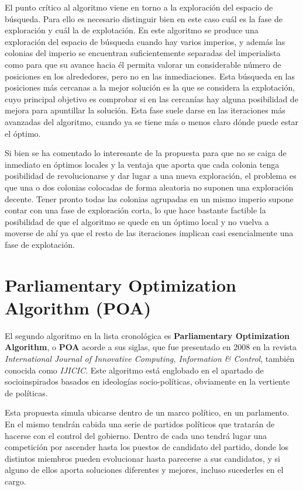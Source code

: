 El punto crítico al algoritmo viene en torno a la exploración del espacio de búsqueda. Para ello es necesario distinguir bien en este caso cuál es la fase de exploración y cuál la de explotación. En este algoritmo se produce una exploración del espacio de búsqueda cuando hay varios imperios, y además las colonias del imperio se encuentran suficientemente separadas del imperialista como para que su avance hacia él permita valorar un considerable número de posiciones en los alrededores, pero no en las inmediaciones. Esta búsqueda en las posiciones más cercanas a la mejor solución es la que se considera la explotación, cuyo principal objetivo es comprobar si en las cercanías hay alguna posibilidad de mejora para apuntillar la solución. Esta fase suele darse en las iteraciones más avanzadas del algoritmo, cuando ya se tiene más o menos claro dónde puede estar el óptimo.

Si bien se ha comentado lo interesante de la propuesta para que no se caiga de inmediato en óptimos locales y la ventaja que aporta que cada colonia tenga posibilidad de revolucionarse y dar lugar a una nueva exploración, el problema es que una o dos colonias colocadas de forma aleatoria no suponen una exploración decente. Tener pronto todas las colonias agrupadas en un mismo imperio supone contar con una fase de exploración corta, lo que hace bastante factible la posibilidad de que el algoritmo se quede en un óptimo local y no vuelva a moverse de ahí ya que el resto de las iteraciones implican casi esencialmente una fase de explotación.

\section{Parliamentary Optimization Algorithm (POA)}

El segundo algoritmo en la lista cronológica es \textbf{Parliamentary Optimization Algorithm}, o \textbf{POA} acorde a sus siglas, que fue presentado en 2008 \cite{poa-article} en la revista \textit{International Journal of Innovative Computing, Information \& Control}, también conocida como \textit{IJICIC}. Este algoritmo está englobado en el apartado de socioinspirados basados en ideologías socio-políticas, obviamente en la vertiente de políticas.

Esta propuesta simula ubicarse dentro de un marco político, en un parlamento. En el mismo tendrán cabida una serie de partidos políticos que tratarán de hacerse con el control del gobierno. Dentro de cada uno tendrá lugar una competición por ascender hasta los puestos de candidato del partido, donde los distintos miembros pueden evolucionar hasta parecerse a sus candidatos, y si alguno de ellos aporta soluciones diferentes y mejores, incluso sucederles en el cargo.

